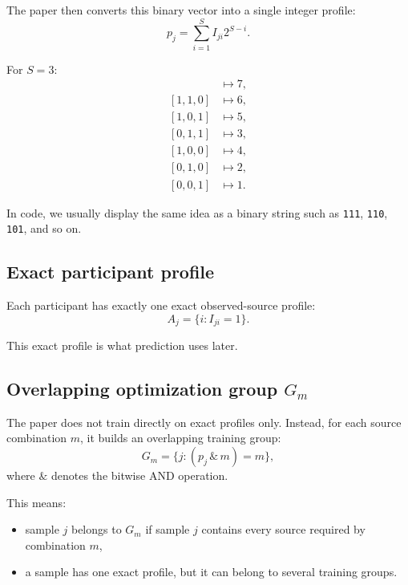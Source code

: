 \documentclass[11pt]{article}
\begin{document}
The paper then converts this binary vector into a single integer profile:
\begin{equation}
\label{eq:profile-integer}
p_j
=
\sum_{i=1}^{S} I_{ji} 2^{S-i}.
\end{equation}

For $S=3$:
\begin{align*}
[1,1,1] &\mapsto 7, \\
[1,1,0] &\mapsto 6, \\
[1,0,1] &\mapsto 5, \\
[0,1,1] &\mapsto 3, \\
[1,0,0] &\mapsto 4, \\
[0,1,0] &\mapsto 2, \\
[0,0,1] &\mapsto 1.
\end{align*}

In code, we usually display the same idea as a binary string such as
\texttt{111}, \texttt{110}, \texttt{101}, and so on.

\subsection{Exact participant profile}

Each participant has exactly one exact observed-source profile:
\begin{equation}
\label{eq:exact-profile}
A_j = \{ i : I_{ji} = 1 \}.
\end{equation}

This exact profile is what prediction uses later.

\subsection{Overlapping optimization group $G_m$}

The paper does not train directly on exact profiles only. Instead, for each
source combination $m$, it builds an overlapping training group:
\begin{equation}
\label{eq:overlapping-group}
G_m
=
\{ j : (p_j \,\&\, m) = m \},
\end{equation}
where $\&$ denotes the bitwise AND operation.

This means:
\begin{itemize}
  \item sample $j$ belongs to $G_m$ if sample $j$ contains every source
  required by combination $m$,
  \item a sample has one exact profile, but it can belong to several training
  groups.
\end{itemize}
\end{document}
